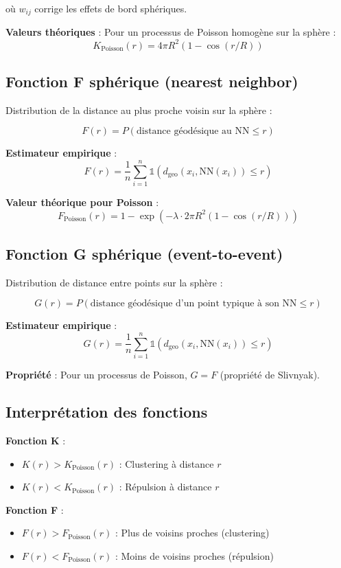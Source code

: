où $w_{ij}$ corrige les effets de bord sphériques.

\textbf{Valeurs théoriques} : Pour un processus de Poisson homogène sur la sphère :
\[
K_{\text{Poisson}}(r) = 4\pi R^2 (1 - \cos(r/R))
\]

\subsection{Fonction F sphérique (nearest neighbor)}

Distribution de la distance au plus proche voisin sur la sphère :

\[
F(r) = P(\text{distance géodésique au NN} \leq r)
\]

\textbf{Estimateur empirique} :
\[
\hat{F}(r) = \frac{1}{n} \sum_{i=1}^n \mathbb{1}(d_{\text{geo}}(x_i, \text{NN}(x_i)) \leq r)
\]

\textbf{Valeur théorique pour Poisson} :
\[
F_{\text{Poisson}}(r) = 1 - \exp\left(-\lambda \cdot 2\pi R^2 (1 - \cos(r/R))\right)
\]

\subsection{Fonction G sphérique (event-to-event)}

Distribution de distance entre points sur la sphère :

\[
G(r) = P(\text{distance géodésique d'un point typique à son NN} \leq r)
\]

\textbf{Estimateur empirique} :
\[
\hat{G}(r) = \frac{1}{n} \sum_{i=1}^n \mathbb{1}(d_{\text{geo}}(x_i, \text{NN}(x_i)) \leq r)
\]

\textbf{Propriété} : Pour un processus de Poisson, $G = F$ (propriété de Slivnyak).

\subsection{Interprétation des fonctions}

\textbf{Fonction K} :
\begin{itemize}
    \item $K(r) > K_{\text{Poisson}}(r)$ : Clustering à distance $r$
    \item $K(r) < K_{\text{Poisson}}(r)$ : Répulsion à distance $r$
\end{itemize}

\textbf{Fonction F} :
\begin{itemize}
    \item $F(r) > F_{\text{Poisson}}(r)$ : Plus de voisins proches (clustering)
    \item $F(r) < F_{\text{Poisson}}(r)$ : Moins de voisins proches (répulsion)
\end{itemize}

